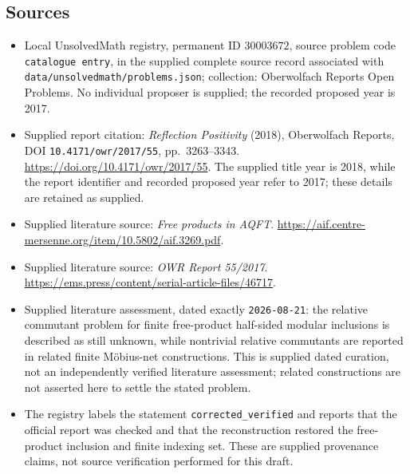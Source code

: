 \documentclass[11pt]{article}
\begin{document}
\subsection{Sources}
\begin{itemize}
\item Local UnsolvedMath registry, permanent ID \(30003672\), source problem code \texttt{catalogue entry}, in the supplied complete source record associated with \texttt{data/unsolvedmath/problems.json}; collection: Oberwolfach Reports Open Problems. No individual proposer is supplied; the recorded proposed year is 2017.
\item Supplied report citation: \emph{Reflection Positivity} (2018), Oberwolfach Reports, DOI \texttt{10.4171/owr/2017/55}, pp.\ 3263--3343. \url{https://doi.org/10.4171/owr/2017/55}. The supplied title year is 2018, while the report identifier and recorded proposed year refer to 2017; these details are retained as supplied.
\item Supplied literature source: \emph{Free products in AQFT}. \url{https://aif.centre-mersenne.org/item/10.5802/aif.3269.pdf}.
\item Supplied literature source: \emph{OWR Report 55/2017}. \url{https://ems.press/content/serial-article-files/46717}.
\item Supplied literature assessment, dated exactly \texttt{2026-08-21}: the relative commutant problem for finite free-product half-sided modular inclusions is described as still unknown, while nontrivial relative commutants are reported in related finite M\"obius-net constructions. This is supplied dated curation, not an independently verified literature assessment; related constructions are not asserted here to settle the stated problem.
\item The registry labels the statement \texttt{corrected\_verified} and reports that the official report was checked and that the reconstruction restored the free-product inclusion and finite indexing set. These are supplied provenance claims, not source verification performed for this draft.
\end{itemize}
\end{document}
